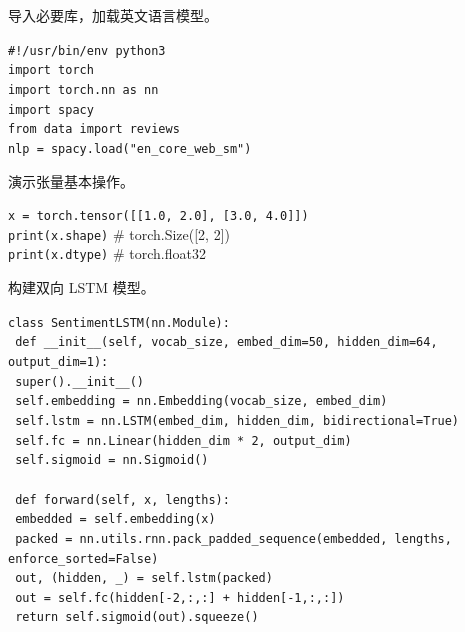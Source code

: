 \documentclass[a4paper, 12pt]{article}
\begin{document}
\begin{tcolorbox}[instancestyle, title=实例14：导入模块并加载 spaCy 模型]
导入必要库，加载英文语言模型。

\texttt{\#!/usr/bin/env python3} \\
\texttt{import torch} \\
\texttt{import torch.nn as nn} \\
\texttt{import spacy} \\
\texttt{from data import reviews} \\
\texttt{nlp = spacy.load("en\_core\_web\_sm")}
\end{tcolorbox}

\begin{tcolorbox}[instancestyle, title=实例15：创建 PyTorch 张量]
演示张量基本操作。

\texttt{x = torch.tensor([[1.0, 2.0], [3.0, 4.0]])} \\
\texttt{print(x.shape)} \quad \# torch.Size([2, 2]) \\
\texttt{print(x.dtype)} \quad \# torch.float32
\end{tcolorbox}

\begin{tcolorbox}[instancestyle, title=实例16：定义 LSTM 情感分类模型]
构建双向 LSTM 模型。

\texttt{class SentimentLSTM(nn.Module):} \\
\texttt{    def \_\_init\_\_(self, vocab\_size, embed\_dim=50, hidden\_dim=64, output\_dim=1):} \\
\texttt{        super().\_\_init\_\_()} \\
\texttt{        self.embedding = nn.Embedding(vocab\_size, embed\_dim)} \\
\texttt{        self.lstm = nn.LSTM(embed\_dim, hidden\_dim, bidirectional=True)} \\
\texttt{        self.fc = nn.Linear(hidden\_dim * 2, output\_dim)} \\
\texttt{        self.sigmoid = nn.Sigmoid()} \\
\texttt{} \\
\texttt{    def forward(self, x, lengths):} \\
\texttt{        embedded = self.embedding(x)} \\
\texttt{        packed = nn.utils.rnn.pack\_padded\_sequence(embedded, lengths, enforce\_sorted=False)} \\
\texttt{        out, (hidden, _) = self.lstm(packed)} \\
\texttt{        out = self.fc(hidden[-2,:,:] + hidden[-1,:,:])} \\
\texttt{        return self.sigmoid(out).squeeze()}
\end{tcolorbox}
\end{document}
